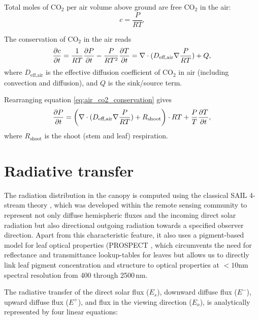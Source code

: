 \documentclass[twoside,10pt]{report}
\begin{document}
\par Total moles of CO$_2$ per air volume above ground are free CO$_2$ in the air:
\begin{equation}
    c = \dfrac{P}{RT}.
\end{equation}

\par The conservation of CO$_2$ in the air reads
\begin{equation}
    \dfrac{\partial c}{\partial t} = 
        \dfrac{1}{RT} \dfrac{\partial P}{\partial t} -
        \dfrac{P}{RT^2} \dfrac{\partial T}{\partial t} =
    \nabla \cdot (D_\text{eff,air} \nabla \dfrac{P}{RT}) + Q, \label{eq:air_co2_conservation}
\end{equation}
where $D_\text{eff,air}$ is the effective diffusion coefficient of CO$_2$ in air (including convection and diffusion), and $Q$ is the sink/source term.

\par Rearranging equation \ref{eq:air_co2_conservation} gives
\begin{equation}
    \dfrac{\partial P}{\partial t} = \left( \nabla \cdot (D_\text{eff,air} \nabla \dfrac{P}{RT}) + R_\text{shoot} \right) \cdot RT + \dfrac{P}{T} \dfrac{\partial T}{\partial t},
\end{equation}
where $R_\text{shoot}$ is the shoot (stem and leaf) respiration.




\section{Radiative transfer}

The radiation distribution in the canopy is computed using the classical SAIL 4-stream theory \citep{Verhoef1984}, which was developed within the remote sensing community to represent not only diffuse hemispheric fluxes and the incoming direct solar radiation but also directional outgoing radiation towards a specified observer direction. Apart from this characteristic feature, it also uses a pigment-based model for leaf optical properties (PROSPECT \citep{Jacquemoud1990, Jacquemoud2009}, which circumvents the need for reflectance and transmittance lookup-tables for leaves but allows us to directly link leaf pigment concentration and structure to optical properties at $<10$nm spectral resolution from 400 through 2500\,nm. 

The radiative transfer of the direct solar flux ($E_s$), downward diffuse flux ($E^{-}$), upward diffuse flux ($E^{+}$), and flux in the viewing direction ($E_o$), is analytically represented by four linear equations: 
\end{document}
